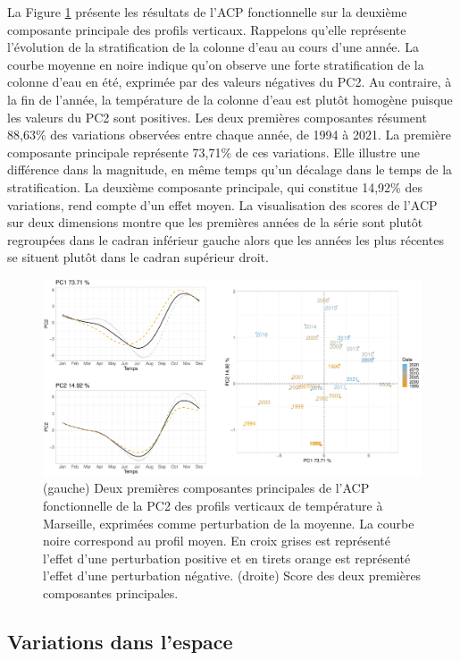 \documentclass[12pt]{article}
\begin{document}
La Figure \ref{acp_pc} présente les résultats de l’ACP fonctionnelle sur la deuxième composante principale des profils verticaux. Rappelons qu’elle représente l’évolution de la stratification de la colonne d’eau au cours d’une année. La courbe moyenne en noire indique qu’on observe une forte stratification de la colonne d’eau en été, exprimée par des valeurs négatives du PC2.  Au contraire, à la fin de l’année, la température de la colonne d’eau est plutôt homogène puisque les valeurs du PC2 sont positives. %
Les deux premières composantes résument 88,63\% des variations observées entre chaque année, de 1994 à 2021. La première composante principale représente 73,71\% de ces variations. Elle illustre une différence dans la magnitude, en même temps qu’un décalage dans le temps de la stratification. La deuxième composante principale, qui constitue 14,92\% des variations, rend compte d’un effet moyen.  La visualisation des scores de l’ACP sur deux dimensions montre que les premières années de la série sont plutôt regroupées dans le cadran inférieur gauche alors que les années les plus récentes se situent plutôt dans le cadran supérieur droit. 

\begin{figure}
\centering
\includegraphics[width=.9\textwidth]{fig/R133_ACP_PC.pdf}
\caption{(gauche) Deux premières composantes principales de l'ACP fonctionnelle de la PC2 des profils verticaux de température à Marseille, exprimées comme perturbation de la moyenne. La courbe noire correspond au profil moyen. En croix grises est représenté l’effet d’une perturbation positive et en tirets orange est représenté l’effet d’une perturbation négative. (droite) Score des deux premières composantes principales.}
\label{acp_pc}
\end{figure}

\subsection{Variations dans l'espace}
\end{document}
